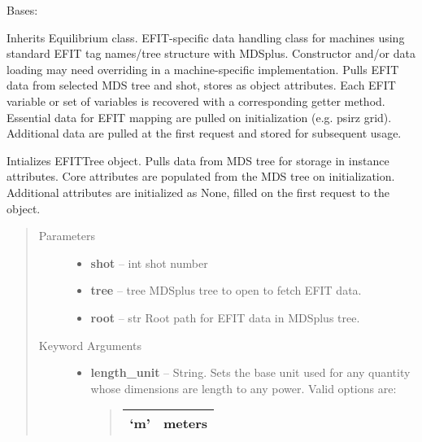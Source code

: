 \documentclass[letterpaper,10pt,english]{sphinxmanual}
\begin{document}
\begin{fulllineitems}
\label{eqtools:eqtools.EFIT.EFITTree}
Bases: {\hyperref[eqtools:eqtools.core.Equilibrium]{}}

Inherits Equilibrium class. EFIT-specific data handling class for machines using
standard EFIT tag names/tree structure with MDSplus. Constructor and/or data loading may
need overriding in a machine-specific implementation.
Pulls EFIT data from selected MDS tree and shot, stores as object attributes.
Each EFIT variable or set of variables is recovered with a corresponding getter method.
Essential data for EFIT mapping are pulled on initialization (e.g. psirz grid).
Additional data are pulled at the first request and stored for subsequent usage.

Intializes EFITTree object. Pulls data from MDS tree for storage in
instance attributes. Core attributes are populated from the MDS tree
on initialization. Additional attributes are initialized as None,
filled on the first request to the object.
\begin{quote}\begin{description}
\item[{Parameters }] \leavevmode\begin{itemize}
\item {} 
\textbf{shot} --
int
shot number

\item {} 
\textbf{tree} --
tree
MDSplus tree to open to fetch EFIT data.

\item {} 
\textbf{root} --
str
Root path for EFIT data in MDSplus tree.

\end{itemize}

\item[{Keyword Arguments}] \leavevmode\begin{itemize}
\item {} 
\textbf{length\_unit} --
String.
Sets the base unit used for any quantity whose
dimensions are length to any power. Valid options are:
\begin{quote}

\begin{tabulary}{\linewidth}{|L|L|}
\hline

`m'
 & 
meters
\\\hline


\end{tabulary}
\end{quote}
\end{itemize}
\end{description}
\end{quote}
\end{fulllineitems}
\end{document}
